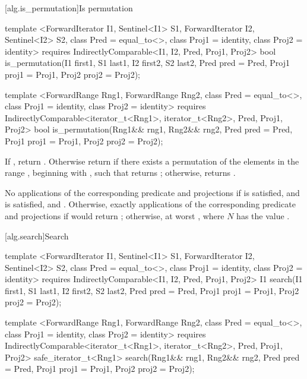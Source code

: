 [alg.is_permutation]{Is permutation}

%
\begin{itemdecl}
template <ForwardIterator I1, Sentinel<I1> S1, ForwardIterator I2,
    Sentinel<I2> S2, class Pred = equal_to<>, class Proj1 = identity,
    class Proj2 = identity>
  requires IndirectlyComparable<I1, I2, Pred, Proj1, Proj2>
  bool is_permutation(I1 first1, S1 last1, I2 first2, S2 last2,
                      Pred pred = Pred{},
                      Proj1 proj1 = Proj1{}, Proj2 proj2 = Proj2{});

template <ForwardRange Rng1, ForwardRange Rng2, class Pred = equal_to<>,
    class Proj1 = identity, class Proj2 = identity>
  requires IndirectlyComparable<iterator_t<Rng1>, iterator_t<Rng2>, Pred, Proj1, Proj2>
  bool is_permutation(Rng1&& rng1, Rng2&& rng2, Pred pred = Pred{},
                      Proj1 proj1 = Proj1{}, Proj2 proj2 = Proj2{});
\end{itemdecl}

\begin{itemdescr}
\pnum
\returns If , return .
Otherwise return  if there exists a permutation of the elements in the
range , beginning with
, such that
 returns 
; otherwise, returns .

\pnum
\complexity
No applications of the corresponding predicate and projections if
 is satisfied, and
 is satisfied,
and .
Otherwise, exactly  applications of the
corresponding predicate and projections if
would return ; otherwise, at
worst , where $N$ has the value .
\end{itemdescr}

[alg.search]{Search}

%
\begin{itemdecl}
template <ForwardIterator I1, Sentinel<I1> S1, ForwardIterator I2,
    Sentinel<I2> S2, class Pred = equal_to<>,
    class Proj1 = identity, class Proj2 = identity>
  requires IndirectlyComparable<I1, I2, Pred, Proj1, Proj2>
  I1
    search(I1 first1, S1 last1, I2 first2, S2 last2,
           Pred pred = Pred{},
           Proj1 proj1 = Proj1{}, Proj2 proj2 = Proj2{});

template <ForwardRange Rng1, ForwardRange Rng2, class Pred = equal_to<>,
    class Proj1 = identity, class Proj2 = identity>
  requires IndirectlyComparable<iterator_t<Rng1>, iterator_t<Rng2>, Pred, Proj1, Proj2>
  safe_iterator_t<Rng1>
    search(Rng1&& rng1, Rng2&& rng2, Pred pred = Pred{},
           Proj1 proj1 = Proj1{}, Proj2 proj2 = Proj2{});
\end{itemdecl}

